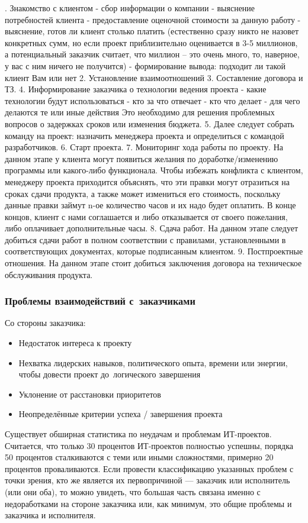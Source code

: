 \documentclass{../industrial-development}
\begin{document}
. Знакомство с клиентом
  - сбор информации о компании
  -  выяснение потребностей клиента
  - предоставление оценочной стоимости за данную работу
 -  выяснение, готов ли клиент столько платить (естественно сразу никто не назовет конкретных сумм, но если проект приблизительно оценивается в 3-5 миллионов, а потенциальный заказчик считает, что миллион –  это очень много, то, наверное, у вас с ним ничего не получится)
  - формирование вывода: подходит ли такой клиент Вам или нет
2. Установление взаимоотношений
3. Составление договора и ТЗ.
4. Информирование заказчика о технологии ведения проекта
 - какие технологии будут использоваться
 - кто за что отвечает
 - кто что делает
 - для чего делаются те или иные действия
 Это необходимо для решения проблемных вопросов о задержках сроков или изменения бюджета.
5. Далее следует собрать команду на проект: назначить менеджера проекта и определиться с командой разработчиков.
6. Старт проекта.
7. Мониторинг хода работы по проекту. 
На данном этапе у клиента могут появиться желания по доработке/изменению программы или какого-либо функционала. Чтобы избежать конфликта с клиентом, менеджеру проекта приходится объяснять, что эти правки могут отразиться на сроках сдачи продукта, а также может измениться его стоимость, поскольку данные правки займут n-ое количество часов и их надо будет оплатить. В конце концов, клиент с нами соглашается и либо отказывается от своего пожелания, либо оплачивает дополнительные часы. 
8. Сдача работ.
На данном этапе следует добиться сдачи работ в полном соответствии с правилами, установленными в соответствующих документах, которые подписанным клиентом.
9. Постпроектные отношения. 
На данном этапе стоит добиться заключения договора на техническое обслуживания продукта.

\begin{frame} \frametitle{Проблемы взаимодействий с~заказчиками}
	Со стороны заказчика:
	\begin{itemize}
		\item Недостаток интереса к проекту
		\item Нехватка лидерских навыков, политического опыта, времени или энергии, чтобы довести проект до~логического завершения
		\item Уклонение от расстановки приоритетов
		\item Неопределённые критерии успеха / завершения проекта
	\end{itemize}
\end{frame}

\lecturenotes
Существует обширная статистика по неудачам и проблемам ИТ-проектов. Считается, что только 30 процентов ИТ-проектов полностью успешны, порядка 50 процентов сталкиваются с теми или иными сложностями, примерно 20 процентов проваливаются. 
Если провести классификацию указанных проблем с точки зрения, кто же является их первопричиной — заказчик или исполнитель (или они оба), то можно увидеть, что большая часть связана именно с недоработками на стороне заказчика или, как минимум, это общие проблемы и заказчика и исполнителя. 
\end{document}
